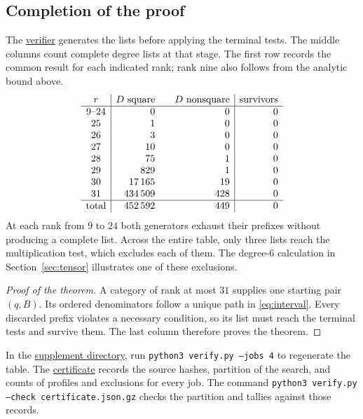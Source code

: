 \documentclass[11pt]{amsart}
\numberwithin{equation}{section}
\newcommand{\supfile}[2]{\href{https://github.com/sebastienpalcoux/WGT-fusion-categories/blob/433d1c45795202991f1693e00d9770e4cccf05f6/papers/rank-bound-supplement/#1}{#2}}
\begin{document}
\subsection{Completion of the proof}\label{sec:finish}
The \supfile{verify.py}{verifier} generates the lists before applying
the terminal tests. The middle columns count complete degree lists at
that stage. The first row records the common result for each indicated
rank; rank nine also follows from the analytic bound above.
\[
\begin{array}{c|r@{\qquad}r|r}
 r & D\text{ square}&D\text{ nonsquare}&\text{survivors}\\ \hline
 9\text{--}24 &0&0&0\\
 25&1&0&0\\
 26&3&0&0\\
 27&10&0&0\\
 28&75&1&0\\
 29&829&1&0\\
 30&17\,165&19&0\\
 31&434\,509&428&0\\ \hline
 \text{total}&452\,592&449&0
\end{array}
\]
At each rank from $9$ to $24$ both generators exhaust their prefixes
without producing a complete list. Across the entire table, only three lists reach the
multiplication test, which excludes each of them. The degree-$6$
calculation in Section~\ref{sec:tensor} illustrates one of these exclusions.
\begin{proof}[Proof of the theorem]
A category of rank at most $31$ supplies one starting pair $(q,B)$.
Its ordered denominators follow a unique path in \eqref{eq:interval}.
Every discarded prefix violates a necessary condition, so its list
must reach the terminal tests and survive them. The last column
therefore proves the theorem.
\end{proof}
In the \supfile{README.md}{supplement directory}, run
\texttt{python3 verify.py --jobs 4} to regenerate the table. The
\supfile{certificate.json.gz}{certificate} records the source hashes,
partition of the search, and counts of profiles and exclusions for every
job. The command \texttt{python3 verify.py --check certificate.json.gz}
checks the partition and tallies against those records.
\end{document}
